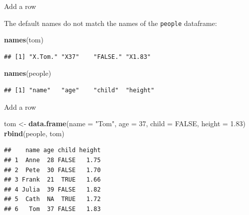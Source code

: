 \documentclass[ignorenonframetext,]{beamer}
\newenvironment{Shaded}{\begin{snugshade}}{\end{snugshade}}
\newcommand{\DataTypeTok}[1]{\textcolor[rgb]{0.13,0.29,0.53}{#1}}
\newcommand{\DecValTok}[1]{\textcolor[rgb]{0.00,0.00,0.81}{#1}}
\newcommand{\FloatTok}[1]{\textcolor[rgb]{0.00,0.00,0.81}{#1}}
\newcommand{\KeywordTok}[1]{\textcolor[rgb]{0.13,0.29,0.53}{\textbf{#1}}}
\newcommand{\NormalTok}[1]{#1}
\newcommand{\OtherTok}[1]{\textcolor[rgb]{0.56,0.35,0.01}{#1}}
\newcommand{\StringTok}[1]{\textcolor[rgb]{0.31,0.60,0.02}{#1}}
\begin{document}
\begin{frame}[fragile]{Add a row}
\protect\hypertarget{add-a-row-1}{}

The default names do not match the names of the \texttt{people}
dataframe:

\begin{Shaded}
\begin{Highlighting}[]
\KeywordTok{names}\NormalTok{(tom)}
\end{Highlighting}
\end{Shaded}

\begin{verbatim}
## [1] "X.Tom." "X37"    "FALSE." "X1.83"
\end{verbatim}

\begin{Shaded}
\begin{Highlighting}[]
\KeywordTok{names}\NormalTok{(people)}
\end{Highlighting}
\end{Shaded}

\begin{verbatim}
## [1] "name"   "age"    "child"  "height"
\end{verbatim}

\end{frame}

\begin{frame}[fragile]{Add a row}
\protect\hypertarget{add-a-row-2}{}

\begin{Shaded}
\begin{Highlighting}[]
\NormalTok{tom <-}\StringTok{ }\KeywordTok{data.frame}\NormalTok{(}\DataTypeTok{name =} \StringTok{"Tom"}\NormalTok{, }\DataTypeTok{age =} \DecValTok{37}\NormalTok{, }
                  \DataTypeTok{child =} \OtherTok{FALSE}\NormalTok{, }\DataTypeTok{height =} \FloatTok{1.83}\NormalTok{)}
\KeywordTok{rbind}\NormalTok{(people, tom)}
\end{Highlighting}
\end{Shaded}

\begin{verbatim}
##    name age child height
## 1  Anne  28 FALSE   1.75
## 2  Pete  30 FALSE   1.70
## 3 Frank  21  TRUE   1.66
## 4 Julia  39 FALSE   1.82
## 5  Cath  NA  TRUE   1.72
## 6   Tom  37 FALSE   1.83
\end{verbatim}

\end{frame}
\end{document}

